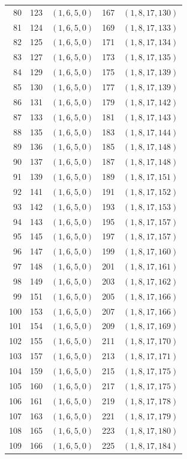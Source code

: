 \begin{center}
\begin{longtable}{@{}rrlrl@{}}
80 & 123 & $(1,6,5,0)$ & 167 & $(1,8,17,130)$\\
81 & 124 & $(1,6,5,0)$ & 169 & $(1,8,17,133)$\\
82 & 125 & $(1,6,5,0)$ & 171 & $(1,8,17,134)$\\
83 & 127 & $(1,6,5,0)$ & 173 & $(1,8,17,135)$\\
84 & 129 & $(1,6,5,0)$ & 175 & $(1,8,17,139)$\\
85 & 130 & $(1,6,5,0)$ & 177 & $(1,8,17,139)$\\
86 & 131 & $(1,6,5,0)$ & 179 & $(1,8,17,142)$\\
87 & 133 & $(1,6,5,0)$ & 181 & $(1,8,17,143)$\\
88 & 135 & $(1,6,5,0)$ & 183 & $(1,8,17,144)$\\
89 & 136 & $(1,6,5,0)$ & 185 & $(1,8,17,148)$\\
90 & 137 & $(1,6,5,0)$ & 187 & $(1,8,17,148)$\\
91 & 139 & $(1,6,5,0)$ & 189 & $(1,8,17,151)$\\
92 & 141 & $(1,6,5,0)$ & 191 & $(1,8,17,152)$\\
93 & 142 & $(1,6,5,0)$ & 193 & $(1,8,17,153)$\\
94 & 143 & $(1,6,5,0)$ & 195 & $(1,8,17,157)$\\
95 & 145 & $(1,6,5,0)$ & 197 & $(1,8,17,157)$\\
96 & 147 & $(1,6,5,0)$ & 199 & $(1,8,17,160)$\\
97 & 148 & $(1,6,5,0)$ & 201 & $(1,8,17,161)$\\
98 & 149 & $(1,6,5,0)$ & 203 & $(1,8,17,162)$\\
99 & 151 & $(1,6,5,0)$ & 205 & $(1,8,17,166)$\\
100 & 153 & $(1,6,5,0)$ & 207 & $(1,8,17,166)$\\
101 & 154 & $(1,6,5,0)$ & 209 & $(1,8,17,169)$\\
102 & 155 & $(1,6,5,0)$ & 211 & $(1,8,17,170)$\\
103 & 157 & $(1,6,5,0)$ & 213 & $(1,8,17,171)$\\
104 & 159 & $(1,6,5,0)$ & 215 & $(1,8,17,175)$\\
105 & 160 & $(1,6,5,0)$ & 217 & $(1,8,17,175)$\\
106 & 161 & $(1,6,5,0)$ & 219 & $(1,8,17,178)$\\
107 & 163 & $(1,6,5,0)$ & 221 & $(1,8,17,179)$\\
108 & 165 & $(1,6,5,0)$ & 223 & $(1,8,17,180)$\\
109 & 166 & $(1,6,5,0)$ & 225 & $(1,8,17,184)$\\

\end{longtable}
\end{center}
